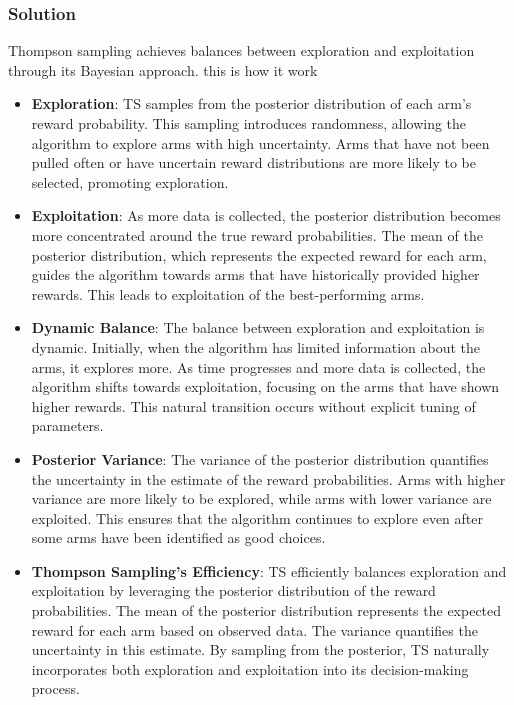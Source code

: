 \documentclass{article}
\begin{document}
\begin{enumerate}[label=(\alph*)]
    \subsubsection*{Solution}
    Thompson sampling achieves balances between exploration and exploitation through its Bayesian approach. this is how it work
    \begin{itemize}
        \item \textbf{Exploration}: TS samples from the posterior distribution of each arm's reward probability. This sampling introduces randomness, allowing the algorithm to explore arms with high uncertainty. Arms that have not been pulled often or have uncertain reward distributions are more likely to be selected, promoting exploration.
        \item \textbf{Exploitation}: As more data is collected, the posterior distribution becomes more concentrated around the true reward probabilities. The mean of the posterior distribution, which represents the expected reward for each arm, guides the algorithm towards arms that have historically provided higher rewards. This leads to exploitation of the best-performing arms.
        \item \textbf{Dynamic Balance}: The balance between exploration and exploitation is dynamic. Initially, when the algorithm has limited information about the arms, it explores more. As time progresses and more data is collected, the algorithm shifts towards exploitation, focusing on the arms that have shown higher rewards. This natural transition occurs without explicit tuning of parameters.
        \item \textbf{Posterior Variance}: The variance of the posterior distribution quantifies the uncertainty in the estimate of the reward probabilities. Arms with higher variance are more likely to be explored, while arms with lower variance are exploited. This ensures that the algorithm continues to explore even after some arms have been identified as good choices.
        \item \textbf{Thompson Sampling's Efficiency}: TS efficiently balances exploration and exploitation by leveraging the posterior distribution of the reward probabilities. The mean of the posterior distribution represents the expected reward for each arm based on observed data. The variance quantifies the uncertainty in this estimate. By sampling from the posterior, TS naturally incorporates both exploration and exploitation into its decision-making process.
    \end{itemize}


\end{enumerate}
\end{document}
